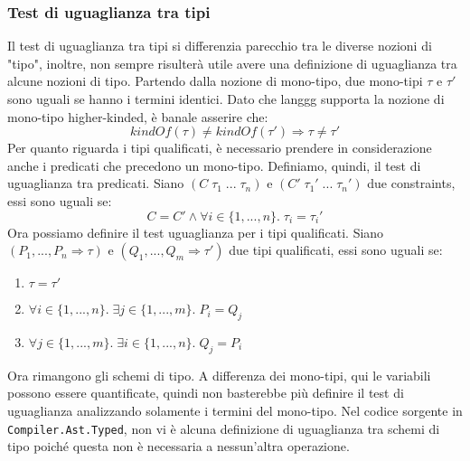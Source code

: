 \documentclass[10pt,a4paper]{article}
\begin{document}
\subsubsection{Test di uguaglianza tra tipi}
Il test di uguaglianza tra tipi si differenzia parecchio tra le diverse nozioni di "tipo", inoltre, non sempre risulterà
utile avere una definizione di uguaglianza tra alcune nozioni di tipo. Partendo dalla nozione di mono-tipo, due
mono-tipi $ \tau $ e $ \tau' $ sono uguali se hanno i termini identici. Dato che langgg supporta la nozione di mono-tipo
higher-kinded, è banale asserire che:
\[ kindOf(\tau) \neq kindOf(\tau') \Longrightarrow \tau \neq \tau' \]
Per quanto riguarda i tipi qualificati, è necessario prendere in considerazione anche i predicati che precedono un
mono-tipo. Definiamo, quindi, il test di uguaglianza tra predicati. Siano $ (C \; \tau_1 \; ... \; \tau_n) $ e
$ (C' \; \tau_1' \; ... \; \tau_n') $ due constraints, essi sono uguali se:
\[ C = C' \wedge \forall i \in \{1, ..., n\}. \; \tau_i = \tau_i' \]
Ora possiamo definire il test uguaglianza per i tipi qualificati. Siano $ (P_1, ..., P_n \Rightarrow \tau) $ e
$ (Q_1, ..., Q_m \Rightarrow \tau') $ due tipi qualificati, essi sono uguali se:
\begin{enumerate}
    \item $ \tau = \tau' $
    \item $ \forall i \in \{1, ..., n\}. \; \exists j \in \{1, ..., m\}. \; P_i = Q_j $
    \item $ \forall j \in \{1, ..., m\}. \; \exists i \in \{1, ..., n\}. \; Q_j = P_i $
\end{enumerate}
Ora rimangono gli schemi di tipo. A differenza dei mono-tipi, qui le variabili possono essere quantificate, quindi non
basterebbe più definire il test di uguaglianza analizzando solamente i termini del mono-tipo. Nel codice sorgente in
\texttt{Compiler.Ast.Typed}, non vi è alcuna definizione di uguaglianza tra schemi di tipo poiché questa non è necessaria
a nessun'altra operazione.
\end{document}
